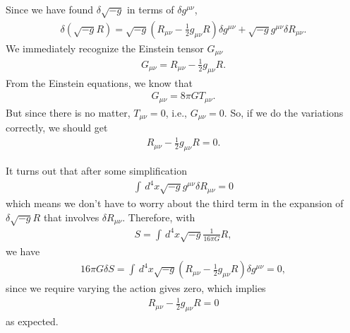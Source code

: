 \documentclass[a4paper,11pt]{article}
\numberwithin{equation}{section}
\theoremstyle{definition}
\newcommand{\f}[2]{\frac{#1}{#2}}
\newcommand{\lp}{\left(}
\newcommand{\rp}{\right)}
\begin{document}
Since we have found $\delta \sqrt{-g}$ in terms of $\delta g^{\mu\nu}$, 
\begin{align}
\delta (\sqrt{-g}R ) = \sqrt{-g}\lp R_{\mu\nu} - \f{1}{2}g_{\mu\nu}R \rp\delta g^{\mu\nu} + \sqrt{-g}g^{\mu\nu}\delta R_{\mu\nu}.
\end{align}
We immediately recognize the Einstein tensor $G_{\mu\nu}$ 
\begin{align}
G_{\mu\nu} = R_{\mu\nu} - \f{1}{2}g_{\mu\nu}R.
\end{align}
From the Einstein equations, we know that 
\begin{align}
G_{\mu\nu} = 8\pi G T_{\mu\nu}.
\end{align}
But since there is no matter, $T_{\mu\nu} = 0$, i.e., $G_{\mu\nu} = 0$. So, if we do the variations correctly, we should get
\begin{align}
R_{\mu\nu} - \f{1}{2}g_{\mu\nu}R = 0.
\end{align}

It turns out that after some simplification
\begin{align}\label{R}
\boxed{\int \,d^4x \sqrt{-g}g^{\mu\nu}\delta R_{\mu\nu} = 0}
\end{align}
which means we don't have to worry about the third term in the expansion of $\delta \sqrt{-g}R$ that involves $\delta R_{\mu\nu}$. Therefore, with
\begin{align}
S = \int \,d^4x \sqrt{-g}\f{1}{16\pi G}R,
\end{align}
we have
\begin{align}
16\pi G \delta S = \int\,d^4x \sqrt{-g}\lp R_{\mu\nu} - \f{1}{2}g_{\mu\nu}R \rp\delta g^{\mu\nu} = 0,
\end{align}
since we require varying the action gives zero, which implies 
\begin{align}
\boxed{R_{\mu\nu} - \f{1}{2}g_{\mu\nu}R = 0}
\end{align}
as expected.\\
\end{document}
